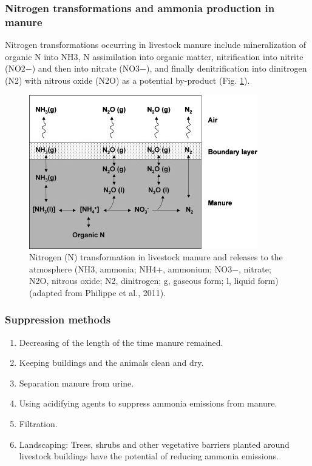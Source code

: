 \documentclass[]{book}
\providecommand{\tightlist}{%
  \setlength{\itemsep}{0pt}\setlength{\parskip}{0pt}}
\begin{document}
\hypertarget{nitrogen-transformations-and-ammonia-production-in-manure}{%
\subsubsection{Nitrogen transformations and ammonia production in manure}\label{nitrogen-transformations-and-ammonia-production-in-manure}}

Nitrogen transformations occurring in livestock manure include mineralization of organic N into NH3, N assimilation into organic matter, nitrification into nitrite (NO2−) and then into nitrate (NO3−), and finally denitrification into dinitrogen (N2) with nitrous oxide (N2O) as a potential by-product (Fig. \ref{fig:ammonia-trans}).

\begin{figure}

{\centering \includegraphics[width=0.5\linewidth]{figures/ammonia-trans} 

}

\caption{Nitrogen (N) transformation in livestock manure and releases to the atmosphere (NH3, ammonia; NH4+, ammonium; NO3−, nitrate; N2O, nitrous oxide; N2, dinitrogen; g, gaseous form; l, liquid form) (adapted from Philippe et al., 2011).}\label{fig:ammonia-trans}
\end{figure}

\hypertarget{suppression-methods}{%
\subsubsection{Suppression methods}\label{suppression-methods}}

\begin{enumerate}
\def\labelenumi{\arabic{enumi}.}
\tightlist
\item
  Decreasing of the length of the time manure remained.
\item
  Keeping buildings and the animals clean and dry.
\item
  Separation manure from urine.
\item
  Using acidifying agents to suppress ammonia emissions from manure.
\item
  Filtration.\\
\item
  Landscaping: Trees, shrubs and other vegetative barriers planted around livestock buildings have the potential of reducing ammonia emissions.
\end{enumerate}
\end{document}

